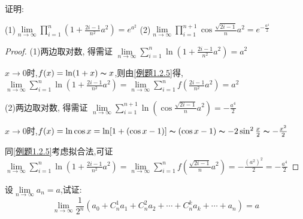 \begin{practice}
    证明:

    (1)$\lim \limits_{n \to \infty} \prod \limits_{i=1}^{n} (1+\frac{2i-1}{n^2}a^2)=e^{a^2}$\quad
    (2)$\lim \limits_{n \to \infty}  \prod \limits_{i=1}^{n+1} \cos \frac{\sqrt{2i-1}}{n}a^2=e^{-\frac{a^4}{2}}$
\end{practice}

\begin{proof}
    (1)两边取对数, 得需证
    $\lim \limits_{n \to \infty} \sum \limits_{i=1}^{n} \ln(1+\frac{2i-1}{n^2}a^2)=a^2$

    $x\to 0$时,$f(x)=\ln (1+x) \thicksim x $,则由\cref{例题1.2.5}得,$\lim \limits_{n \to \infty} \sum \limits_{i=1}^{n} \ln(1+\frac{2i-1}{n^2}a^2)
        =\lim \limits_{n \to \infty} \sum \limits_{i=1}^{n} f(\frac{2i-1}{n^2}a^2)
        =a^2$

    (2)两边取对数, 得需证
    $\lim \limits_{n \to \infty} \sum \limits_{i=1}^{n+1} \ln(\cos \frac{\sqrt{2i-1}}{n}a^2)=-\frac{a^4}{2}$

    $x\to 0$时,$f(x)=\ln \cos x=\ln [1+(\cos x-1)] \thicksim (\cos x-1) \thicksim -2\sin^2 \frac{x}{2} \thicksim -\frac{x^2}{2}$

    同\cref{例题1.2.5}考虑拟合法,可证$\lim \limits_{n \to \infty} \sum \limits_{i=1}^{n} \ln(1+\frac{2i-1}{n^2}a^2)
        =\lim \limits_{n \to \infty} \sum \limits_{i=1}^{n} f(\frac{\sqrt{2i-1}}{n}a^2)
        =-\frac{(a^2)^2}{2}
        =-\frac{a^4}{2}$
\end{proof}

\begin{practice}\label{小试牛刀1.2.2}
    设$\lim \limits_{n \to \infty} a_n = a$,试证:
    \begin{equation*}
        \lim \limits_{n \to \infty} \frac{1}{2^n} (a_0+C_n^1 a_1 + C_n^2 a_2 + \cdots + C_n^k a_k + \cdots + a_n)=a
    \end{equation*}
\end{practice}

